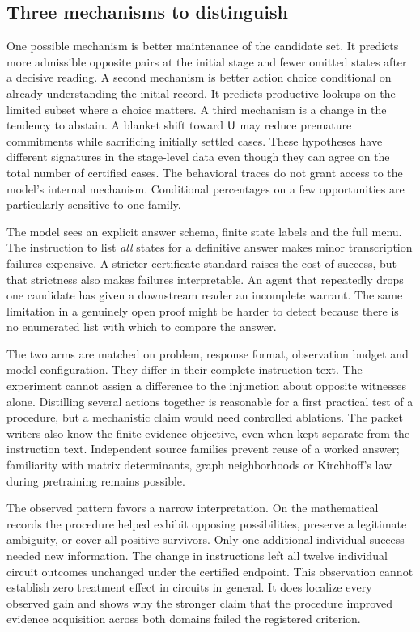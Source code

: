 \documentclass[12pt,letterpaper]{article}
\begin{document}
\subsection{Three mechanisms to distinguish}

One possible mechanism is better maintenance of the candidate set. It predicts more admissible opposite pairs at the initial stage and fewer omitted states after a decisive reading. A second mechanism is better action choice conditional on already understanding the initial record. It predicts productive lookups on the limited subset where a choice matters. A third mechanism is a change in the tendency to abstain. A blanket shift toward $\mathsf U$ may reduce premature commitments while sacrificing initially settled cases. These hypotheses have different signatures in the stage-level data even though they can agree on the total number of certified cases. The behavioral traces do not grant access to the model's internal mechanism. Conditional percentages on a few opportunities are particularly sensitive to one family.

The model sees an explicit answer schema, finite state labels and the full menu. The instruction to list \emph{all} states for a definitive answer makes minor transcription failures expensive. A stricter certificate standard raises the cost of success, but that strictness also makes failures interpretable. An agent that repeatedly drops one candidate has given a downstream reader an incomplete warrant. The same limitation in a genuinely open proof might be harder to detect because there is no enumerated list with which to compare the answer.

The two arms are matched on problem, response format, observation budget and model configuration. They differ in their complete instruction text. The experiment cannot assign a difference to the injunction about opposite witnesses alone. Distilling several actions together is reasonable for a first practical test of a procedure, but a mechanistic claim would need controlled ablations. The packet writers also know the finite evidence objective, even when kept separate from the instruction text. Independent source families prevent reuse of a worked answer; familiarity with matrix determinants, graph neighborhoods or Kirchhoff's law during pretraining remains possible.

The observed pattern favors a narrow interpretation. On the mathematical records the procedure helped exhibit opposing possibilities, preserve a legitimate ambiguity, or cover all positive survivors. Only one additional individual success needed new information. The change in instructions left all twelve individual circuit outcomes unchanged under the certified endpoint. This observation cannot establish zero treatment effect in circuits in general. It does localize every observed gain and shows why the stronger claim that the procedure improved evidence acquisition across both domains failed the registered criterion.
\end{document}
